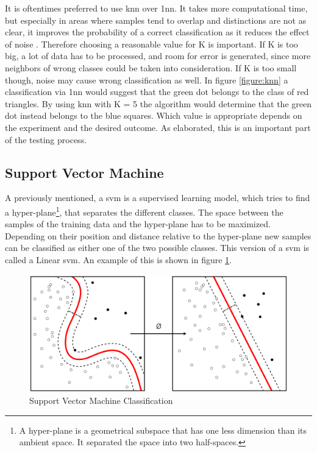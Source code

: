 It is oftentimes preferred to use \gls{knn} over \gls{1nn}. It takes more computational time, but especially in areas where samples tend to overlap and distinctions are not as clear, it improves the probability of a correct classification as it reduces the effect of noise \autocite[]{clusterAnalysis}. Therefore choosing a reasonable value for K is important. If K is too big, a lot of data has to be processed, and room for error is generated, since more neighbors of wrong classes could be taken into consideration. If K is too small though, noise may cause wrong classification as well. In figure \ref{figure:knn} a classification via \gls{1nn} would suggest that the green dot belongs to the class of red triangles. By using \gls{knn} with K = 5 the algorithm would determine that the green dot instead belongs to the blue squares. Which value is appropriate depends on the experiment and the desired outcome. As elaborated, this is an important part of the testing process.


\subsection{Support Vector Machine}
A previously mentioned, a \gls{svm} is a supervised learning model, which tries to find a hyper-plane\footnote{A hyper-plane is a geometrical subspace that has one less dimension than its ambient space. It separated the space into two half-spaces.}, that separates the different classes. The space between the samples of the training data and the hyper-plane has to be maximized. Depending on their position and distance relative to the hyper-plane new samples can be classified as either one of the two possible classes. This version of a \gls{svm} is called a Linear \gls{svm}. An example of this is shown in figure \ref{figure:svm}.

\begin{figure}[!ht]
    \centering
    \includegraphics[width=0.75\linewidth]{images/Classification-Svm.png}
    \caption[]{
        Support Vector Machine Classification \autocite[]{image-svm}
    }
    \label{figure:svm}
\end{figure}

